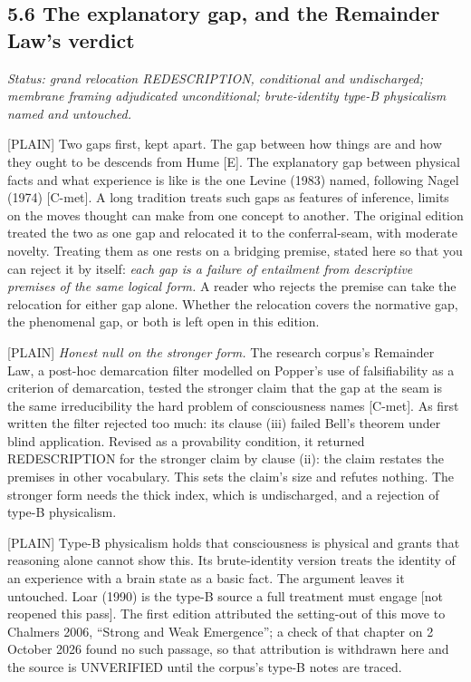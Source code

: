 \documentclass[11pt]{article}
\newcommand{\register}[1]{{\ttfamily\small #1}}
\begin{document}
\subsection*{5.6 The explanatory gap, and the Remainder Law's verdict}

\emph{Status: grand relocation REDESCRIPTION, conditional and undischarged; membrane framing adjudicated unconditional; brute-identity type-B physicalism named and untouched.}

\register{[PLAIN]} Two gaps first, kept apart. The gap between how things are and how they ought to be descends from Hume [E]. The explanatory gap between physical facts and what experience is like is the one Levine (1983) named, following Nagel (1974) [C-met]. A long tradition treats such gaps as features of inference, limits on the moves thought can make from one concept to another. The original edition treated the two as one gap and relocated it to the conferral-seam, with moderate novelty. Treating them as one rests on a bridging premise, stated here so that you can reject it by itself: \emph{each gap is a failure of entailment from descriptive premises of the same logical form.} A reader who rejects the premise can take the relocation for either gap alone. Whether the relocation covers the normative gap, the phenomenal gap, or both is left open in this edition.

\register{[PLAIN]} \emph{Honest null on the stronger form.} The research corpus's Remainder Law, a post-hoc demarcation filter modelled on Popper's use of falsifiability as a criterion of demarcation, tested the stronger claim that the gap at the seam is the same irreducibility the hard problem of consciousness names [C-met]. As first written the filter rejected too much: its clause (iii) failed Bell's theorem under blind application. Revised as a provability condition, it returned REDESCRIPTION for the stronger claim by clause (ii): the claim restates the premises in other vocabulary. This sets the claim's size and refutes nothing. The stronger form needs the thick index, which is undischarged, and a rejection of type-B physicalism.

\register{[PLAIN]} Type-B physicalism holds that consciousness is physical and grants that reasoning alone cannot show this. Its brute-identity version treats the identity of an experience with a brain state as a basic fact. The argument leaves it untouched. Loar (1990) is the type-B source a full treatment must engage [not reopened this pass]. The first edition attributed the setting-out of this move to Chalmers 2006, ``Strong and Weak Emergence''; a check of that chapter on 2 October 2026 found no such passage, so that attribution is withdrawn here and the source is UNVERIFIED until the corpus's type-B notes are traced.
\end{document}
